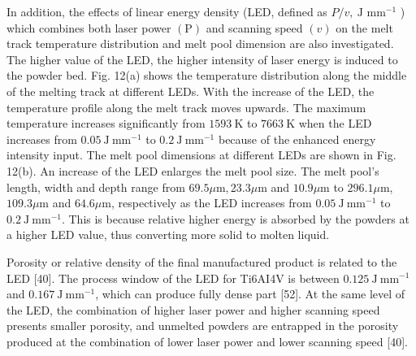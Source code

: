 \documentclass[10pt]{article}
\begin{document}
In addition, the effects of linear energy density (LED, defined as $P / v, \mathrm{~J}$ $\mathrm{mm}^{-1}$ ) which combines both laser power $(\mathrm{P})$ and scanning speed $(v)$ on the melt track temperature distribution and melt pool dimension are also investigated. The higher value of the LED, the higher intensity of laser energy is induced to the powder bed. Fig. 12(a) shows the temperature distribution along the middle of the melting track at different LEDs. With the increase of the LED, the temperature profile along the melt track moves upwards. The maximum temperature increases significantly from $1593 \mathrm{~K}$ to $7663 \mathrm{~K}$ when the LED increases from $0.05 \mathrm{~J} \mathrm{~mm}^{-1}$ to $0.2 \mathrm{~J} \mathrm{~mm}^{-1}$ because of the enhanced energy intensity input. The melt pool dimensions at different LEDs are shown in Fig. 12(b). An increase of the LED enlarges the melt pool size. The melt pool's length, width and depth range from $69.5 \mu \mathrm{m}, 23.3 \mu \mathrm{m}$ and $10.9 \mu \mathrm{m}$ to $296.1 \mu \mathrm{m}$, $109.3 \mu \mathrm{m}$ and $64.6 \mu \mathrm{m}$, respectively as the LED increases from $0.05 \mathrm{~J} \mathrm{~mm}^{-1}$ to $0.2 \mathrm{~J} \mathrm{~mm}^{-1}$. This is because relative higher energy is absorbed by the powders at a higher LED value, thus converting more solid to molten liquid.

Porosity or relative density of the final manufactured product is related to the LED [40]. The process window of the LED for Ti6AI4V is between $0.125 \mathrm{~J} \mathrm{~mm}^{-1}$ and $0.167 \mathrm{~J} \mathrm{~mm}^{-1}$, which can produce fully dense part [52]. At the same level of the LED, the combination of higher laser power and higher scanning speed presents smaller porosity, and unmelted powders are entrapped in the porosity produced at the combination of lower laser power and lower scanning speed [40].
\end{document}

